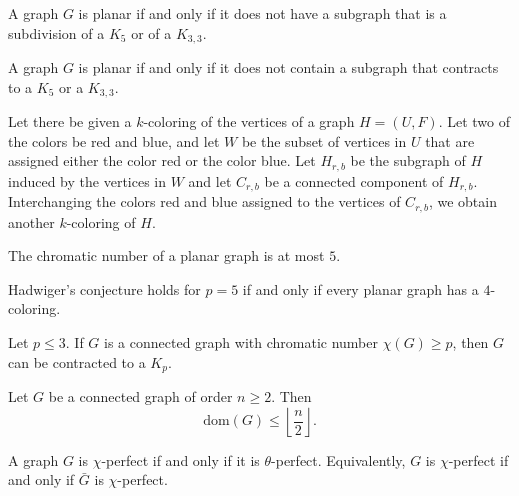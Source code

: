 \begin{theorem}
  \label{thm:12.2.3}
  A graph $G$ is planar if and only if it does not have a subgraph that is a subdivision of a $K_5$
  or of a $K_{3,3}$.
\end{theorem}

\begin{theorem}
  \label{thm:12.2.4}
  A graph $G$ is planar if and only if it does not contain a subgraph that contracts to a $K_5$ or
  a $K_{3,3}$.
\end{theorem}

\begin{theorem}
  \label{thm:12.3.1}
  Let there be given a $k$-coloring of the vertices of a graph $H=(U, F)$. Let two of the colors be red and blue, and let $W$ be the subset of vertices in $U$ that are assigned either the color red or the color blue. Let $H_{r, b}$ be the subgraph of $H$ induced by the vertices in $W$ and let $C_{r, b}$ be a connected component of $H_{r, b}$. Interchanging the colors red and blue assigned to the vertices of $C_{r, b}$, we obtain another $k$-coloring of $H$.
\end{theorem}

\begin{theorem}
  \label{thm:12.3.2}
  The chromatic number of a planar graph is at most $5$.
\end{theorem}

\begin{theorem}
  \label{thm:12.3.3}
  Hadwiger's conjecture holds for $p = 5$ if and only if every planar graph has a $4$-coloring.
\end{theorem}

\begin{theorem}
  \label{thm:12.3.4}
  Let $p \leq 3$. If $G$ is a connected graph with chromatic number $\chi(G) \geq p$, then $G$ can be contracted to a $K_p$.
\end{theorem}

\begin{theorem}
  \label{thm:12.4.1}
  Let $G$ be a connected graph of order $n \geq 2$. Then
  $$\text{dom}(G) \leq \left\lfloor \frac{n}{2} \right\rfloor.$$
\end{theorem}

\begin{theorem}
  \label{thm:12.4.2}
  A graph $G$ is $\chi$-perfect if and only if it is $\theta$-perfect. Equivalently, $G$ is $\chi$-perfect if and only if $\bar{G}$ is $\chi$-perfect.
\end{theorem}

